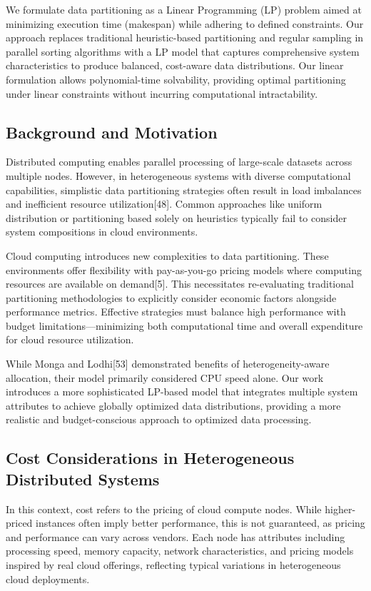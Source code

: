 \documentclass[]{interact}
\theoremstyle{plain}
\theoremstyle{definition}
\theoremstyle{remark}
\begin{document}
We formulate data partitioning as a Linear Programming (LP) problem aimed at minimizing execution time (makespan) while adhering to defined constraints. Our approach replaces traditional heuristic-based partitioning and regular sampling in parallel sorting algorithms with a LP model that captures comprehensive system characteristics to produce balanced, cost-aware data distributions. Our linear formulation allows polynomial-time solvability, providing optimal partitioning under linear constraints without incurring computational intractability.

\subsection{Background and Motivation}

Distributed computing enables parallel processing of large-scale datasets across multiple nodes. However, in heterogeneous systems with diverse computational capabilities, simplistic data partitioning strategies often result in load imbalances and inefficient resource utilization[48]. Common approaches like uniform distribution or partitioning based solely on heuristics typically fail to consider system compositions in cloud environments.

Cloud computing introduces new complexities to data partitioning. These environments offer flexibility with pay-as-you-go pricing models where computing resources are available on demand[5]. This necessitates re-evaluating traditional partitioning methodologies to explicitly consider economic factors alongside performance metrics. Effective strategies must balance high performance with budget limitations—minimizing both computational time and overall expenditure for cloud resource utilization. 

While Monga and Lodhi[53] demonstrated benefits of heterogeneity-aware allocation, their model primarily considered CPU speed alone. Our work introduces a more sophisticated LP-based model that integrates multiple system attributes to achieve globally optimized data distributions, providing a more realistic and budget-conscious approach to optimized data processing.

\subsection{Cost Considerations in Heterogeneous Distributed Systems}

In this context, cost refers to the pricing of cloud compute nodes. While higher-priced instances often imply better performance, this is not guaranteed, as pricing and performance can vary across vendors. Each node has attributes including processing speed, memory capacity, network characteristics, and pricing models inspired by real cloud offerings, reflecting typical variations in heterogeneous cloud deployments.
\end{document}
